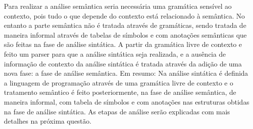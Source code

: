 \documentclass{article}
\begin{document}














Para realizar a análise semântica seria necessária uma gramática sensível ao contexto, pois tudo o que depende do contexto está relacionado à semântica. No entanto a parte semântica não é tratada através de gramáticas, sendo tratada de maneira informal através de tabelas de símbolos e com anotações semânticas que são feitas na fase de análise sintática. A partir da gramática livre de contexto e feito um parser para que a análise sintática seja realizada, e a ausência de informação de contexto da análise sintática é tratada através da adição de uma nova fase: a fase de análise semântica. Em resumo: Na análise sintática é definida a linguagem de programação através de uma gramática livre de contexto e o tratamento semântico é feito posteriormente, na fase de análise semântica, de maneira informal, com tabela de símbolos e com anotações nas estruturas obtidas na fase de análise sintática. As etapas de análise serão explicadas com mais detalhes na próxima questão.
\end{document}
